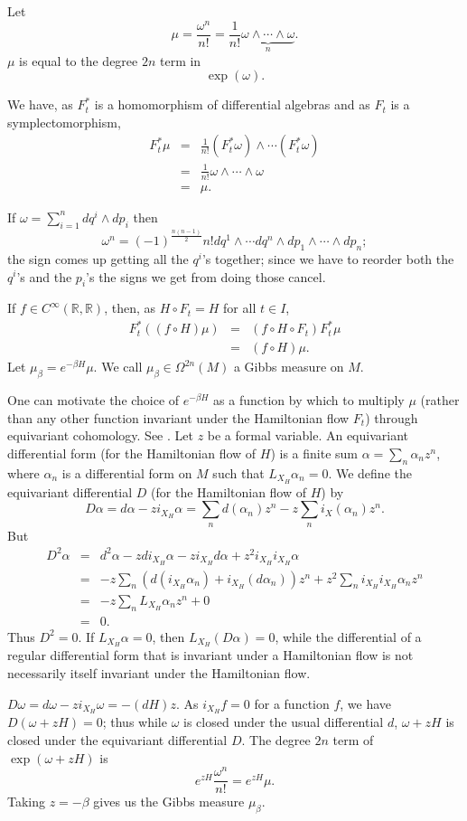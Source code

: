 \documentclass{article}
\begin{document}
Let
\[
\mu=\frac{\omega^n}{n!}=\frac{1}{n!} \underbrace{\omega \wedge \cdots \wedge \omega}_{n}.
\]
$\mu$ is equal to the degree $2n$ term in
\[
\exp(\omega).
\]

We have, as $F_t^*$ is a homomorphism of differential algebras \cite[p.~113, Theorem 2.4.9]{foundations} and as $F_t$ is a symplectomorphism,
\begin{eqnarray*}
F_t^* \mu&=&\frac{1}{n!} (F_t^* \omega) \wedge \cdots (F_t^* \omega)\\
&=&\frac{1}{n!} \omega \wedge \cdots \wedge \omega\\
&=&\mu.
\end{eqnarray*}


If $\omega=\sum_{i=1}^n dq^i \wedge dp_i$ then
\[
\omega^n=(-1)^{\frac{n(n-1)}{2}}n! dq^1 \wedge \cdots dq^n \wedge dp_1 \wedge \cdots \wedge dp_n;
\]
the sign comes up getting all the $q^i$'s together; since we have to reorder both the $q^i$'s and the $p_i$'s the signs we get from doing those cancel.


If $f \in C^\infty(\mathbb{R},\mathbb{R})$, then, as $H \circ F_t = H$ for all $t \in I$,
\begin{eqnarray*}
F_t^* ((f\circ H) \mu)&=&(f\circ H \circ F_t) F_t^* \mu\\
&=&(f \circ H) \mu.
\end{eqnarray*}
Let $\mu_\beta=e^{-\beta H}\mu$. We call $\mu_\beta \in \Omega^{2n}(M)$ a Gibbs measure on $M$.

One can motivate the choice of $e^{-\beta H}$ as a function  by which to multiply $\mu$ (rather than any other function invariant under the Hamiltonian flow $F_t$) through 
equivariant cohomology. See \cite[pp.~197--198]{MR1853077}. Let $z$ be a formal variable. An equivariant differential form (for the Hamiltonian flow of $H$) is a finite sum
$\alpha=\sum_n \alpha_n z^n$, where $\alpha_n$ is a differential form on $M$ such that $L_{X_H} \alpha_n=0$. We define the equivariant differential $D$ (for the Hamiltonian flow of $H$)
by
\[
D \alpha = d\alpha-zi_{X_H} \alpha=\sum_n d(\alpha_n)z^n-z\sum_n i_X (\alpha_n) z^n.
\]
But
\begin{eqnarray*}
D^2 \alpha&=&d^2 \alpha-z di_{X_H}\alpha-zi_{X_H} d\alpha   + z^2 i_{X_H} i_{X_H} \alpha\\
&=&-z\sum_n \left(d(i_{X_H} \alpha_n) +i_{X_H} (d\alpha_n) \right)z^n+z^2 \sum_n i_{X_H} i_{X_H} \alpha_n z^n\\
&=&-z\sum_n L_{X_H} \alpha_n z^n+0\\
&=&0.
\end{eqnarray*}
Thus $D^2=0$. If $L_{X_H} \alpha=0$, then $L_{X_H} (D\alpha)=0$, while the differential of a regular differential form that is invariant
under a Hamiltonian flow is not necessarily itself invariant under the Hamiltonian flow. 

$D\omega=d\omega-zi_{X_H} \omega=-(dH) z$. As $i_{X_H} f=0$ for a function $f$, we have
$D(\omega+zH)=0$; thus while $\omega$ is closed under the usual differential $d$,
$\omega+zH$ is closed under the equivariant differential $D$. The degree $2n$ term of $\exp(\omega+zH)$ is
\[
e^{zH} \frac{\omega^n}{n!}=e^{zH} \mu.
\]
Taking $z=-\beta$ gives us the Gibbs measure $\mu_\beta$.



\end{document}
